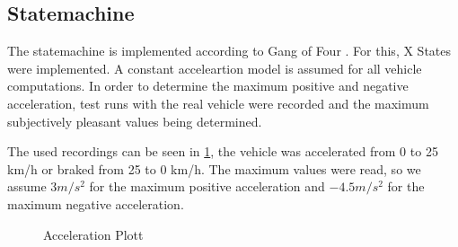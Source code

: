 \documentclass[11pt,oneside,openright]{mpreport}
\begin{document}
\subsection{Statemachine}

% 
The statemachine is implemented according to Gang of Four \cite{lester2008gang}. For this, X States were implemented. 
A constant acceleartion model is assumed for all vehicle computations. In order to determine the maximum positive and negative acceleration, 
test runs with the real vehicle  were recorded and the maximum subjectively pleasant values being determined. 

The used recordings can be seen in \cref{max_accel}, the vehicle was accelerated from 0 to 25 km/h or braked from 25 to 0 km/h.
The maximum values were read, so we assume $ 3m/{s^2} $ for the maximum positive acceleration and $ -4.5m/{s ^ 2} $ for the maximum negative acceleration.




\begin{figure}[!ht]
\caption{Acceleration Plott}
\begin{center}
\label{max_accel}
\end{center}
\end{figure}
\end{document}
